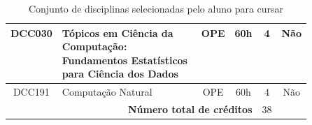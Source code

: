 \documentclass{article}
\begin{document}
\begin{table}[H]
\begin{tabular}{|c|p{0.5\linewidth}|c|c|c|c|}
			DCC030 & Tópicos em Ciência da Computação: Fundamentos Estatísticos para Ciência dos Dados & OPE & 60h & 4 & Não \\ \hline
			DCC191 & Computação Natural & OPE & 60h & 4 & Não \\ \hline
			\multicolumn{4}{|r|}{\textbf{Número total de créditos}} & \multicolumn{1}{|c}{38} & \multicolumn{1}{c|}{ } \\ \hline
			
		\end{tabular}
		\caption{Conjunto de disciplinas selecionadas pelo aluno para cursar}
		\label{tab:DscSel}
	\end{table}
	
\end{document}

